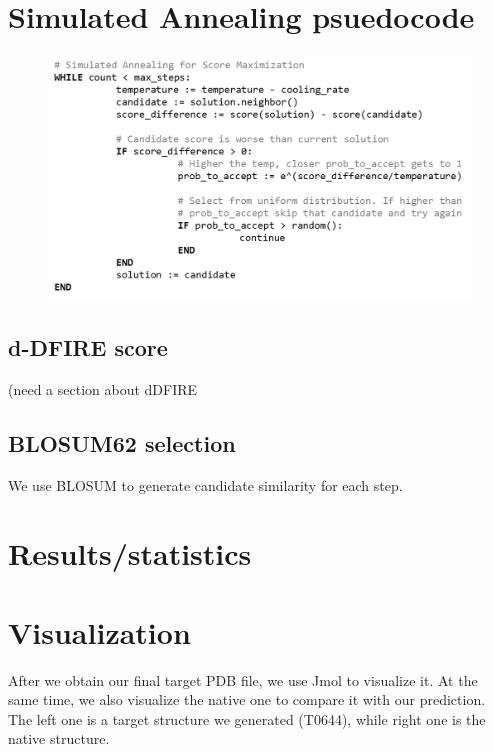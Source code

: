 \documentclass{article}
\begin{document}
\section{Simulated Annealing psuedocode}
\begin{figure}[H]
\begin{center}
\includegraphics[width=\textwidth]{sa}
\label{Fig:blosum}
\end{center}
\end{figure}

\subsection{d-DFIRE score}

(need a section about dDFIRE

\subsection{BLOSUM62 selection}

We use BLOSUM to generate candidate similarity for each step.

\section{Results/statistics}


\newpage
\section{Visualization}

After we obtain our final target PDB file, we use Jmol to visualize it. At the same time, we also visualize the native one to compare it with our prediction.  The left one is a target structure we generated (T0644), while right one is the native structure.
\end{document}
